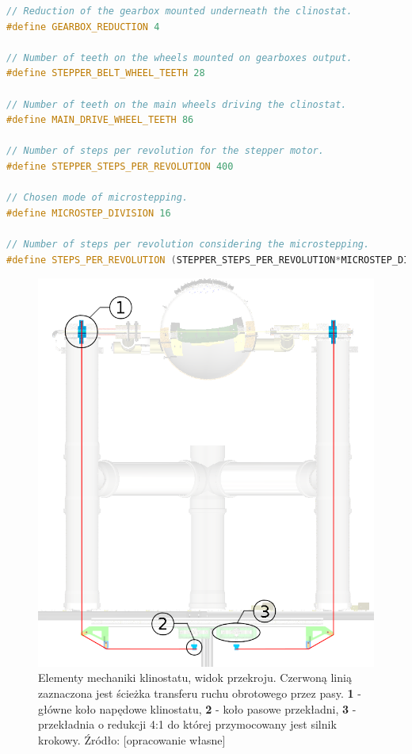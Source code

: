 \begin{lstlisting}[language=C++, caption=Plik \textbf{clinostat\_mechanics.hpp}.]
// Reduction of the gearbox mounted underneath the clinostat.
#define GEARBOX_REDUCTION 4 

// Number of teeth on the wheels mounted on gearboxes output.
#define STEPPER_BELT_WHEEL_TEETH 28 

// Number of teeth on the main wheels driving the clinostat.
#define MAIN_DRIVE_WHEEL_TEETH 86 

// Number of steps per revolution for the stepper motor.
#define STEPPER_STEPS_PER_REVOLUTION 400 

// Chosen mode of microstepping.
#define MICROSTEP_DIVISION 16 

// Number of steps per revolution considering the microstepping.
#define STEPS_PER_REVOLUTION (STEPPER_STEPS_PER_REVOLUTION*MICROSTEP_DIVISION)
\end{lstlisting}

\begin{figure}[h]
	
	\centering
	\includegraphics[scale=0.3]{klinostat_przekroj}
	\caption{Elementy mechaniki klinostatu, widok przekroju. Czerwoną linią zaznaczona jest ścieżka transferu ruchu obrotowego przez pasy. \textbf{1} - główne koło napędowe klinostatu, \textbf{2} - koło pasowe przekładni, \textbf{3} - przekładnia o redukcji 4:1 do której przymocowany jest silnik krokowy. Źródło: [opracowanie własne]} 
	\label{fig:klinostat_mechanika}
\end{figure}

